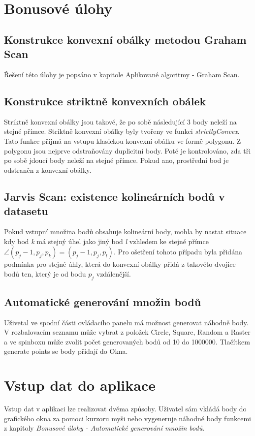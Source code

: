 \documentclass[a4paper, 12pt]{article}
\begin{document}
\section{Bonusové úlohy}

\subsection{Konstrukce konvexní obálky metodou Graham Scan}
Řešení této úlohy je popsáno v kapitole Aplikované algoritmy - Graham Scan.

\subsection{Konstrukce striktně konvexních obálek}
Striktně konvexní obálky jsou takové, že po sobě následující 3 body neleží na stejné přímce. Striktně konvexní obálky byly tvořeny ve funkci \textit{strictlyConvex}. Tato funkce příjmá na vstupu klasickou konvexní obálku ve formě polygonu. Z polygonu jsou nejprve odstraňovány duplicitní body. Poté je kontrolováno, zda tři po sobě jdoucí body neleží na stejné přímce. Pokud ano, prostřední bod je odstraněn z konvexní obálky.

\subsection{Jarvis Scan: existence kolineárních bodů v datasetu}
Pokud vstupní množina bodů obsahuje kolineární body, mohla by nastat situace kdy bod \textit{k} má stejný úhel jako jiný bod \textit{l} vzhledem ke stejné přímce $\angle (p_j-1, p_j, p_k)=(p_j-1, p_j, p_l)$. Pro ošetření tohoto případu byla přidána podmínka pro stejné úhly, která do konvexní obálky přidá z takovéto dvojice bodů ten, který je od bodu $p_j$ vzdálenější. 

\subsection{Automatické generování množin bodů}

Uživetal ve spodní části ovládacího panelu má možnost generovat náhodně body. V rozbalovacím seznamu může vybrat z položek Circle, Square, Random a Raster a ve spinboxu může zvolit počet generovaných bodů od 10 do 1000000. Tlačítkem generate points se body přidají do Okna.

\section{Vstup dat do aplikace}
Vstup dat v aplikaci lze realizovat dvěma způsoby. Uživatel sám vkládá body do grafického okna za pomoci kurzoru myši nebo vygeneruje náhodné body funkcemi z kapitoly \textit{Bonusové úlohy - Automatické generování množin bodů}.
\end{document}
